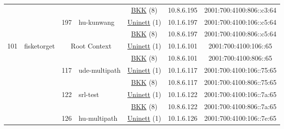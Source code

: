 \begin{small}
\begin{center}
\begin{longtable}{|c|c|c|c|c|c|c|c|}
  &  &  &  & \multicolumn{2}{|c|}{\tiny{\href{http://bkk.no}{BKK} (8)}} & \tiny{10.8.6.195} & \tiny{2001:700:4100:806::c3:64} \\* \cline{3-3}\cline{4-4}\cline{5-5}\cline{6-6}\cline{7-7}\cline{8-8}
  &  & \multirow{2}{*}{\tiny{197}} & \multicolumn{1}{|l|}{\multirow{2}{*}{\tiny{hu-kunwang}}} & \multicolumn{2}{|c|}{\tiny{\href{https://www.uninett.no}{Uninett} (1)}} & \tiny{10.1.6.197} & \tiny{2001:700:4100:106::c5:64} \\* \cline{5-5}\cline{6-6}\cline{7-7}\cline{8-8}
  &  &  &  & \multicolumn{2}{|c|}{\tiny{\href{http://bkk.no}{BKK} (8)}} & \tiny{10.8.6.197} & \tiny{2001:700:4100:806::c5:64} \\ \hline
 \multirow{34}{*}{\tiny{101}} & \multicolumn{1}{|l|}{\multirow{34}{*}{\tiny{fisketorget}}} & \multicolumn{2}{|c|}{\multirow{2}{*}{\tiny{Root Context}}} & \multicolumn{2}{|c|}{\tiny{\href{https://www.uninett.no}{Uninett} (1)}} & \tiny{10.1.6.101} & \tiny{2001:700:4100:106::65} \\* \cline{5-5}\cline{6-6}\cline{7-7}\cline{8-8}
  &  & \multicolumn{2}{|c|}{} & \multicolumn{2}{|c|}{\tiny{\href{http://bkk.no}{BKK} (8)}} & \tiny{10.8.6.101} & \tiny{2001:700:4100:806::65} \\* \cline{3-3}\cline{4-4}\cline{5-5}\cline{6-6}\cline{7-7}\cline{8-8}
  &  & \multirow{2}{*}{\tiny{117}} & \multicolumn{1}{|l|}{\multirow{2}{*}{\tiny{ude-multipath}}} & \multicolumn{2}{|c|}{\tiny{\href{https://www.uninett.no}{Uninett} (1)}} & \tiny{10.1.6.117} & \tiny{2001:700:4100:106::75:65} \\* \cline{5-5}\cline{6-6}\cline{7-7}\cline{8-8}
  &  &  &  & \multicolumn{2}{|c|}{\tiny{\href{http://bkk.no}{BKK} (8)}} & \tiny{10.8.6.117} & \tiny{2001:700:4100:806::75:65} \\* \cline{3-3}\cline{4-4}\cline{5-5}\cline{6-6}\cline{7-7}\cline{8-8}
  &  & \multirow{2}{*}{\tiny{122}} & \multicolumn{1}{|l|}{\multirow{2}{*}{\tiny{srl-test}}} & \multicolumn{2}{|c|}{\tiny{\href{https://www.uninett.no}{Uninett} (1)}} & \tiny{10.1.6.122} & \tiny{2001:700:4100:106::7a:65} \\* \cline{5-5}\cline{6-6}\cline{7-7}\cline{8-8}
  &  &  &  & \multicolumn{2}{|c|}{\tiny{\href{http://bkk.no}{BKK} (8)}} & \tiny{10.8.6.122} & \tiny{2001:700:4100:806::7a:65} \\* \cline{3-3}\cline{4-4}\cline{5-5}\cline{6-6}\cline{7-7}\cline{8-8}
  &  & \multirow{2}{*}{\tiny{126}} & \multicolumn{1}{|l|}{\multirow{2}{*}{\tiny{hu-multipath}}} & \multicolumn{2}{|c|}{\tiny{\href{https://www.uninett.no}{Uninett} (1)}} & \tiny{10.1.6.126} & \tiny{2001:700:4100:106::7e:65} \\* \cline{5-5}\cline{6-6}\cline{7-7}\cline{8-8}

\end{longtable}
\end{center}
\end{small}
